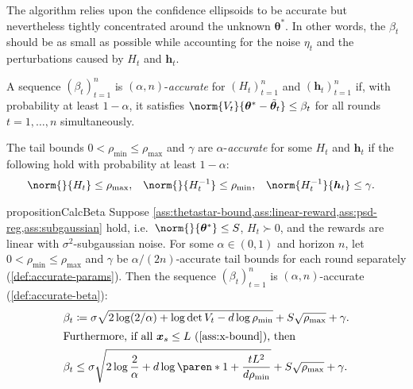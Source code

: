\documentclass{article}
\renewcommand{\vec}[1]{\bm{#1}}
\newcommand{\defeq}{\coloneq}
\newcommand{\inv}[1]{#1^{-1}}
\DeclarePairedDelimiter{\paren}()
\begin{document}
The algorithm relies upon the confidence ellipsoids to be accurate but
nevertheless tightly concentrated around the unknown $\vec\theta^*$.
In other words, the $\beta_t$ should be as small as possible while
accounting for the noise $\eta_t$ and the perturbations caused by
$H_t$ and $\vec h_t$.

\begin{definition}\label{def:accurate-beta}
  A sequence $(\beta_t)_{t=1}^n$ is $(\alpha, n)$-\emph{accurate} for
  $(H_t)_{t=1}^n$ and $(\vec h_t)_{t=1}^n$ if, with probability at
  least $1-\alpha$, it satisfies
  $\norm{V_t}{\vec\theta^* - \tilde{\vec\theta}_t} \le \beta_t$
  for all rounds $t=1,\dotsc,n$ simultaneously.
\end{definition}

\begin{definition}\label{def:accurate-params}
  The tail bounds $0 < \rho_{\min} \le \rho_{\max}$ and $\gamma$ are
  $\alpha$-\emph{accurate} for some $H_t$ and $\vec h_t$ if the
  following hold with probability at least $1-\alpha$:
  \begin{align*}
    \norm{}{H_t} &\le \rho_{\max},
    &\norm{}{\inv{H_t}} &\le \rho_{\min},
    &\norm{\inv{H_t}}{\vec h_t} &\le \gamma.
  \end{align*}
\end{definition}

\begin{restatable}{proposition}{CalcBeta}%
  \label{prop:calc-beta}
  Suppose
  \cref{ass:thetastar-bound,ass:linear-reward,ass:psd-reg,ass:subgaussian}
  hold, i.e.\ $\norm{}{\vec\theta^*} \le S$, $H_t \succ 0$, and the
  rewards are linear with $\sigma^2$-subgaussian noise.  For some
  $\alpha\in(0,1)$ and horizon $n$, let
  $0 < \rho_{\min} \le \rho_{\max}$ and $\gamma$ be
  $\alpha/(2n)$-accurate tail bounds for each round separately
  (\cref{def:accurate-params}).  Then the sequence $(\beta_t)_{t=1}^n$
  is $(\alpha,n)$-accurate (\cref{def:accurate-beta}):
  \begin{align*}
    \beta_t &\defeq \sigma\sqrt{2\log(2/\alpha) + \log\det V_t - d\log\rho_{\min}}
             + S\sqrt{\rho_{\max}} + \gamma. \\
    \shortintertext{Furthermore, if all $\vec x_s \le L$
    (\cref{ass:x-bound}), then}
    \beta_t &\le \sigma\sqrt{2\log\frac{2}{\alpha} + d\log\paren*{1 + \frac{tL^2}{d\rho_{\min}}}}
             + S\sqrt{\rho_{\max}} + \gamma.
  \end{align*}
\end{restatable}
\end{document}

